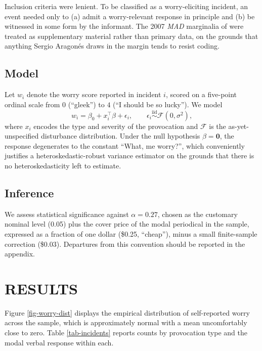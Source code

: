 \documentclass{cpthesis}
\begin{document}
Inclusion criteria were lenient. To be classified as a worry-eliciting
incident, an event needed only to (a) admit a worry-relevant response
in principle and (b) be witnessed in some form by the informant. The
2007 \textit{MAD} marginalia of \citet{aragones2007marginal} were
treated as supplementary material rather than primary data, on the
grounds that anything Sergio Aragon\'es draws in the margin tends to
resist coding.

\section{Model}

Let $w_i$ denote the worry score reported in incident $i$, scored on a
five-point ordinal scale from $0$ (``gleek'') to $4$ (``I should be so
lucky''). We model
\begin{equation}\label{eq-worry-model}
    w_i = \beta_0 + x_i^\top\beta + \epsilon_i,
    \qquad
    \epsilon_i \stackrel{\text{iid}}{\sim} \mathcal{F}\!\left(0, \sigma^2\right),
\end{equation}
where $x_i$ encodes the type and severity of the provocation and
$\mathcal{F}$ is the as-yet-unspecified disturbance distribution.
Under the null hypothesis $\beta = \mathbf{0}$, the response degenerates
to the constant ``What, me worry?'', which conveniently justifies a
heteroskedastic-robust variance estimator on the grounds that there is
no heteroskedasticity left to estimate.

\section{Inference}

We assess statistical significance against $\alpha = 0.27$, chosen as
the customary nominal level (0.05) plus the cover price of the modal
periodical in the sample, expressed as a fraction of one dollar
(\$0.25, ``cheap''), minus a small finite-sample correction (\$0.03).
Departures from this convention should be reported in the appendix.

\chapter{RESULTS}\label{ch-results}

Figure \ref{fig-worry-dist} displays the empirical distribution of
self-reported worry across the sample, which is approximately normal
with a mean uncomfortably close to zero. Table \ref{tab-incidents}
reports counts by provocation type and the modal verbal response
within each.
\end{document}
